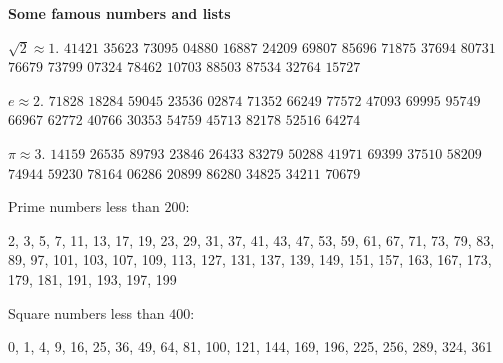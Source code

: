 \vfill

\begin{center}\textbf{Some famous numbers and lists}\end{center}

\begin{multicols}{2}
\(\sqrt 2 \approx 1.\)
\(41421\)
\(35623\)
\(73095\)
\(04880\)
\(16887\)
\(24209\)
\(69807\)
\(85696\)
\(71875\)
\(37694\)
\(80731\)
\(76679\)
\(73799\)
\(07324\)
\(78462\)
\(10703\)
\(88503\)
\(87534\)
\(32764\)
\(15727\)

\(e \approx 2.\)
\(71828\)
\(18284\)
\(59045\)
\(23536\)
\(02874\)
\(71352\)
\(66249\)
\(77572\)
\(47093\)
\(69995\)
\(95749\)
\(66967\)
\(62772\)
\(40766\)
\(30353\)
\(54759\)
\(45713\)
\(82178\)
\(52516\)
\(64274\)

\(\pi \approx 3.\)
\(14159\)
\(26535\)
\(89793\)
\(23846\)
\(26433\)
\(83279\)
\(50288\)
\(41971\)
\(69399\)
\(37510\)
\(58209\)
\(74944\)
\(59230\)
\(78164\)
\(06286\)
\(20899\)
\(86280\)
\(34825\)
\(34211\)
\(70679\)

\columnbreak

Prime numbers less than \(200\):

2,
3,
5,
7,
11,
13,
17,
19,
23,
29,
31,
37,
41,
43,
47,
53,
59,
61,
67,
71,
73,
79,
83,
89,
97,
101,
103,
107,
109,
113,
127,
131,
137,
139,
149,
151,
157,
163,
167,
173,
179,
181,
191,
193,
197,
199

Square numbers less than \(400\):

0,
1,
4,
9,
16,
25,
36,
49,
64,
81,
100,
121,
144,
169,
196,
225,
256,
289,
324,
361
\end{multicols}

\vfill
